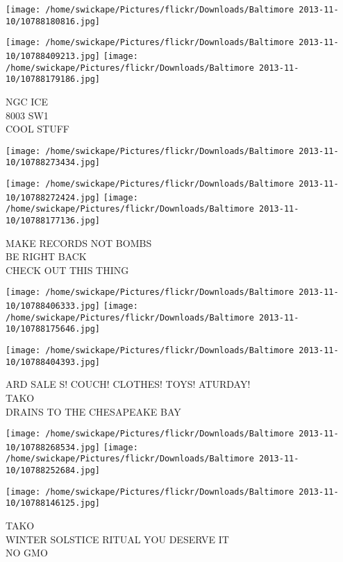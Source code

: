 \documentclass[10pt,letterpaper]{article}
\begin{document}
\texttt{[image: /home/swickape/Pictures/flickr/Downloads/Baltimore 2013-11-10/10788180816.jpg]}

\vspace{0.25in}
\texttt{[image: /home/swickape/Pictures/flickr/Downloads/Baltimore 2013-11-10/10788409213.jpg]}
\texttt{[image: /home/swickape/Pictures/flickr/Downloads/Baltimore 2013-11-10/10788179186.jpg]}

NGC ICE\\
8003 SW1\\
COOL STUFF
\pagebreak

\texttt{[image: /home/swickape/Pictures/flickr/Downloads/Baltimore 2013-11-10/10788273434.jpg]}

\vspace{0.25in}
\texttt{[image: /home/swickape/Pictures/flickr/Downloads/Baltimore 2013-11-10/10788272424.jpg]}
\texttt{[image: /home/swickape/Pictures/flickr/Downloads/Baltimore 2013-11-10/10788177136.jpg]}

MAKE RECORDS NOT BOMBS\\
BE RIGHT BACK\\
CHECK OUT THIS THING
\pagebreak

\texttt{[image: /home/swickape/Pictures/flickr/Downloads/Baltimore 2013-11-10/10788406333.jpg]}
\texttt{[image: /home/swickape/Pictures/flickr/Downloads/Baltimore 2013-11-10/10788175646.jpg]}

\vspace{0.25in}
\texttt{[image: /home/swickape/Pictures/flickr/Downloads/Baltimore 2013-11-10/10788404393.jpg]}

ARD SALE S! COUCH! CLOTHES! TOYS! ATURDAY!\\
TAKO\\
DRAINS TO THE CHESAPEAKE BAY
\pagebreak

\texttt{[image: /home/swickape/Pictures/flickr/Downloads/Baltimore 2013-11-10/10788268534.jpg]}
\texttt{[image: /home/swickape/Pictures/flickr/Downloads/Baltimore 2013-11-10/10788252684.jpg]}

\texttt{[image: /home/swickape/Pictures/flickr/Downloads/Baltimore 2013-11-10/10788146125.jpg]}

TAKO\\
WINTER SOLSTICE RITUAL YOU DESERVE IT\\
NO GMO
\pagebreak
\end{document}
